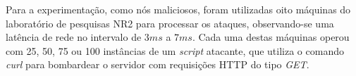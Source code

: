 Para a experimentação, como nós maliciosos, foram utilizadas oito máquinas do laboratório de pesquisas NR2 para processar os ataques, observando-se uma latência de rede no intervalo de $3ms$ a $7ms$. Cada uma destas máquinas operou com 25, 50, 75 ou 100 instâncias de um \emph{script} atacante, que utiliza o comando \emph{curl} para bombardear o servidor com requisições HTTP do tipo \emph{GET}. %


